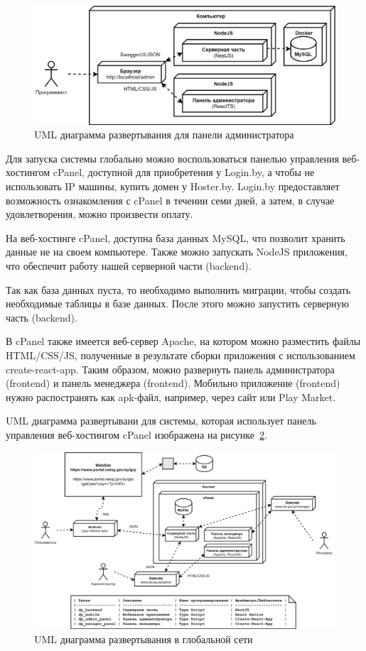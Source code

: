 \begin{figure}[!h]
    \centering

    \includegraphics[width=13cm]
    {images/UML/deployment/admin.png}

    \caption{UML диаграмма развертывания для панели администратора}

    \label{fig:db_UML_deployment_admin}
\end{figure}

Для запуска системы глобально можно воспользоваться панелью управления веб-хостингом cPanel,
доступной для приобретения у Login.by, а чтобы не использовать IP машины, купить домен у Hoster.by.
Login.by предоставляет возможность ознакомления с cPanel в течении семи дней,
а затем, в случае удовлетворения, можно произвести оплату.

На веб-хостинге cPanel, доступна база данных MySQL, что позволит хранить данные не на своем компьютере.
Также можно запускать NodeJS приложения, что обеспечит работу нашей серверной части (backend).

Так как база данных пуста, то необходимо выполнить миграции, чтобы создать необходимые таблицы в базе данных.
После этого можно запустить серверную часть (backend).

В cPanel также имеется веб-сервер Apache, на котором можно разместить файлы HTML/CSS/JS,
полученные в результате сборки приложения с использованием create-react-app.
Таким образом, можно развернуть панель администратора (frontend) и панель менеджера (frontend).
Мобильно приложение (frontend) нужно распостранять как apk-файл, например, через сайт или Play Market.

UML диаграмма развертывани для системы,
которая использует панель управления веб-хостингом cPanel изображена на рисунке~\ref{fig:db_UML_deployment_prod}.

\begin{figure}[!h]
    \centering

    \includegraphics[width=17.5cm]
    {images/UML/deployment/production.png}

    \caption{UML диаграмма развертывания в глобальной сети}

    \label{fig:db_UML_deployment_prod}
\end{figure}

